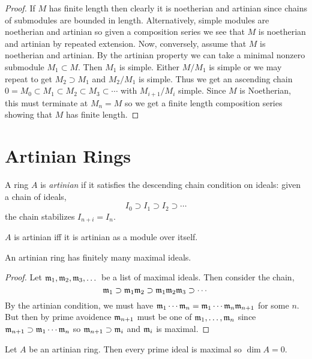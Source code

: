 \documentclass[12pt]{article}
\begin{document}
\begin{proof}
If $M$ has finite length then clearly it is noetherian and artinian since chains of submodules are bounded in length. Alternatively, simple modules are noetherian and artinian  so given a composition series we see that $M$ is noetherian and artinian by repeated extension. Now, conversely, assume that $M$ is noetherian and artinian. By the artinian property we can take a minimal nonzero submodule $M_1 \subset M$. Then $M_1$ is simple. Either $M / M_1$ is simple or we may repeat to get $M_2 \supset M_1$ and $M_2 / M_1$ is simple. Thus we get an ascending chain $0 = M_0 \subset M_1 \subset M_2 \subset M_3 \subset  \cdots$ with $M_{i+1}/M_i$ simple. Since $M$ is Noetherian, this must terminate at $M_n = M$ so we get a finite length composition series showing that $M$ has finite length.
\end{proof}

\section{Artinian Rings}

\begin{defn}
A ring $A$ is \textit{artinian} if it satisfies the descending chain condition on ideals: given a chain of ideals,
\[ I_0 \supset I_1 \supset I_2 \supset \cdots \]
the chain stabilizes $I_{n+i} = I_n$. 
\end{defn}

\begin{rmk}
$A$ is artinian iff it is artinian as a module over itself.
\end{rmk}

\begin{prop}
An artinian ring has finitely many maximal ideals.
\end{prop}

\begin{proof}
Let $\mathfrak{m}_1, \mathfrak{m}_2, \mathfrak{m}_3, \dots$ be a list of maximal ideals. Then consider the chain,
\[ \mathfrak{m}_1 \supset \mathfrak{m}_1 \mathfrak{m}_2 \supset \mathfrak{m}_1 \mathfrak{m}_2 \mathfrak{m}_3 \supset \cdots \]
By the artinian condition, we must have $\mathfrak{m}_1 \cdots \mathfrak{m}_n = \mathfrak{m}_1 \cdots \mathfrak{m}_n \mathfrak{m}_{n+1}$ for some $n$. But then by prime avoidence $\mathfrak{m}_{n+1}$ must be one of $\mathfrak{m}_1, \dots, \mathfrak{m}_n$ since $\mathfrak{m}_{n+1} \supset \mathfrak{m}_1 \cdots \mathfrak{m}_n$ so $\mathfrak{m}_{n+1} \supset \mathfrak{m}_i$ and $\mathfrak{m}_i$ is maximal.
\end{proof}

\begin{prop}
Let $A$ be an artinian ring. Then every prime ideal is maximal so $\dim{A} = 0$.
\end{prop}
\end{document}
